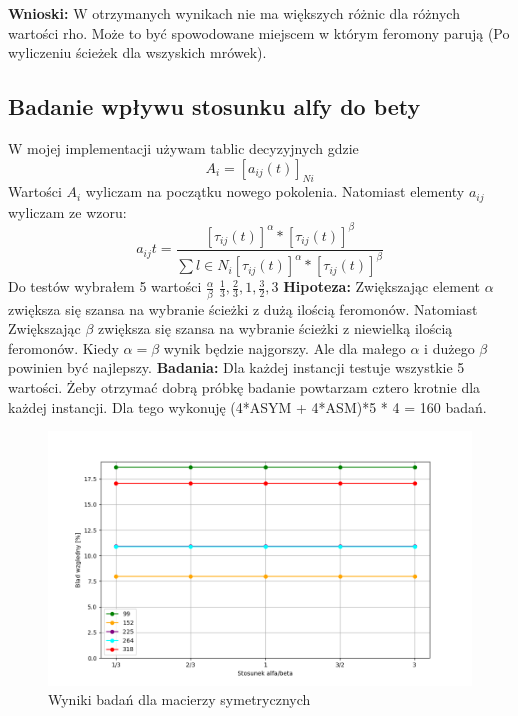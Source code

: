 \documentclass{article}
\begin{document}
        \FloatBarrier
        \textbf{Wnioski: } W otrzymanych wynikach nie ma większych różnic dla różnych wartości rho.
        Może to być spowodowane miejscem w którym feromony parują (Po wyliczeniu ścieżek dla wszyskich mrówek).
      \subsection{Badanie wpływu stosunku alfy do bety}
        W mojej implementacji używam tablic decyzyjnych gdzie \[ A_i = [a_{ij} (t)]_{Ni}\]
        Wartości $A_i$ wyliczam na początku nowego pokolenia. Natomiast elementy $a_{ij}$
        wyliczam ze wzoru:
        \[
            a_{ij}t = \frac{[\tau_{ij}(t)]^\alpha*[\tau_{ij}(t)]^\beta}{\sum{l\in N_i}[\tau_{ij}(t)]^\alpha*[\tau_{ij}(t)]^\beta}
        \]
        Do testów wybrałem 5 wartości $\frac{\alpha}{\beta}$ $\frac{1}{3},\frac{2}{3},1,\frac{3}{2},3$\linebreak
        \textbf{Hipoteza: } Zwiększając element $\alpha$ zwiększa się szansa na wybranie ścieżki z dużą 
        ilością feromonów. Natomiast Zwiększając $\beta$ zwiększa się szansa na wybranie ścieżki z niewielką
        ilością feromonów. Kiedy $\alpha = \beta$ wynik będzie najgorszy. Ale dla małego $\alpha$ i dużego
        $\beta$ powinien być najlepszy. \linebreak
        \textbf{Badania: } Dla każdej instancji testuje wszystkie 5 wartości. 
        Żeby otrzymać dobrą próbkę badanie powtarzam cztero krotnie dla każdej 
        instancji. Dla tego wykonuję (4*ASYM + 4*ASM)*5 * 4 = 160 badań.\linebreak
        \FloatBarrier
        
        \FloatBarrier
        \begin{figure}[ht]
          \centering
          \includegraphics[width=\textwidth]{src/plots/symAoAB.png}
          \caption{Wyniki badań dla macierzy symetrycznych}
          \label{fig:symAB}
        \end{figure}
\end{document}
